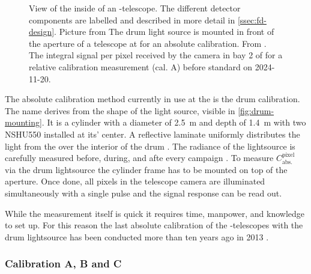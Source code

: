 \begin{figure}[t]
  \centering
  \hspace{0.1cm}
  \hspace{0.1cm}
  \caption[]{ View of the inside of an
  \FD-telescope. The different detector components are labelled and described 
  in more detail in \cref{ssec:fd-design}. Picture from 
  \cite{pierreaugerobservatoryP22500022004} 
   The drum light source is mounted in front of the 
  aperture of a telescope at \CO for an absolute calibration. From 
  \cite{crissUpdateRecentAbsolute2010}.  The
  integral signal per pixel received by the camera in bay 2 of \CO for a 
  relative calibration measurement (cal. A) before standard \DAQ on 2024-11-20.}
  \label{fig:camera-stuff}
\end{figure}

The absolute calibration method currently in use at the \PAO is the drum 
calibration. The name derives from the shape of the light source, visible in 
\cref{fig:drum-mounting}. It is a cylinder with a diameter of \SI{2.5}{\meter} 
and depth of \SI{1.4}{\meter} with two NSHU550 \UV \LEDs installed at its' 
center. A reflective laminate uniformly distributes the light from the \LED 
over the interior of the drum \cite{brackAbsolutePhotometricCalibration2004}. 
The radiance of the lightsource is carefully measured before, during, and afte 
every \DAQ campaign \cite{brackAugerFluorescenceDetector2013}. To measure 
$C^\mathrm{pixel}_\mathrm{abs.}$ via the drum lightsource the cylinder frame 
has to be mounted on top of the \FD aperture. Once done, all pixels in the 
telescope camera are illuminated simultaneously with a single \LED pulse and 
the signal response can be read out.

While the measurement itself is quick it requires time, manpower, and knowledge
to set up. For this reason the last absolute calibration of the \FD-telescopes 
with the drum lightsource has been conducted more than ten years ago in 2013 
\cite{dorofeevFDAbsoluteCalibration2013}. 

\subsubsection{Calibration A, B and C}

